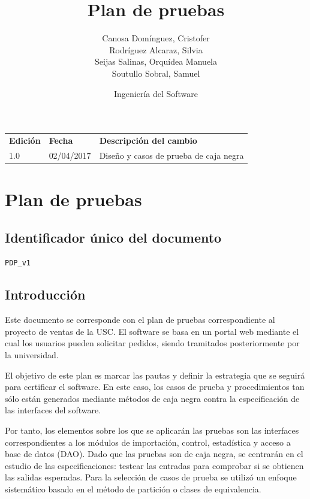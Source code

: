 \documentclass[10pt,a4paper]{article}
\title{Plan de pruebas}
\author{Canosa Domínguez, Cristofer \\ Rodríguez Alcaraz, Silvia \\ Seijas Salinas, Orquídea Manuela \\ Soutullo Sobral, Samuel}
\date{Ingeniería del Software}
\begin{document}
	\maketitle
	
	\newpage
	\begin{table}[htpb]
		\centering
		\begin{tabular}{|l|l|l|}
			\hline
			\rowcolor[HTML]{9B9B9B} 
			\multicolumn{3}{|c|}{\cellcolor[HTML]{9B9B9B}{\color[HTML]{000000} \textbf{CONTROL DE VERSIONES}}} \\ \hline
			\rowcolor[HTML]{C0C0C0} 
			\textbf{Edición} & \textbf{Fecha} & \textbf{Descripción del cambio} \\ \hline
			1.0 & 02/04/2017 & Diseño y casos de prueba de caja negra \\ \hline
		\end{tabular}
	\end{table}
	
	\newpage
	\tableofcontents
	\newpage
	
\section{Plan de pruebas}
	\subsection{Identificador único del documento}
		\texttt{PDP\_v1}

	\subsection{Introducción}
		Este documento se corresponde con el plan de pruebas correspondiente al proyecto de ventas de la USC. El software se basa en un portal web mediante el cual los usuarios pueden solicitar pedidos, siendo tramitados posteriormente por la universidad.

		El objetivo de este plan es marcar las pautas y definir la estrategia que se seguirá para certificar el software. En este caso, los casos de prueba y procedimientos tan sólo están generados mediante métodos de caja negra contra la especificación de las interfaces del software.

		Por tanto, los elementos sobre los que se aplicarán las pruebas son las interfaces correspondientes a los módulos de importación, control, estadística y acceso a base de datos (DAO). Dado que las pruebas son de caja negra, se centrarán en el estudio de las especificaciones: testear las entradas para comprobar si se obtienen las salidas esperadas. Para la selección de casos de prueba se utilizó un enfoque sistemático basado en el método de partición o clases de equivalencia.
	
\end{document}

